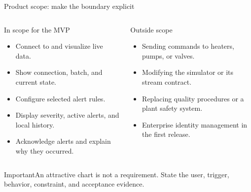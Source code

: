 \begin{frame}{Product scope: make the boundary explicit}
\begin{columns}[T]
\begin{block}{In scope for the MVP}\begin{itemize}
\item Connect to and visualize live data.
\item Show connection, batch, and current state.
\item Configure selected alert rules.
\item Display severity, active alerts, and local history.
\item Acknowledge alerts and explain why they occurred.
\end{itemize}\end{block}
\begin{block}{Outside scope}\begin{itemize}
\item Sending commands to heaters, pumps, or valves.
\item Modifying the simulator or its stream contract.
\item Replacing quality procedures or a plant safety system.
\item Enterprise identity management in the first release.
\end{itemize}\end{block}
\end{columns}
\begin{alertblock}{Important}An attractive chart is not a requirement. State the user, trigger, behavior, constraint, and acceptance evidence.\end{alertblock}
\coursefooter
\end{frame}

